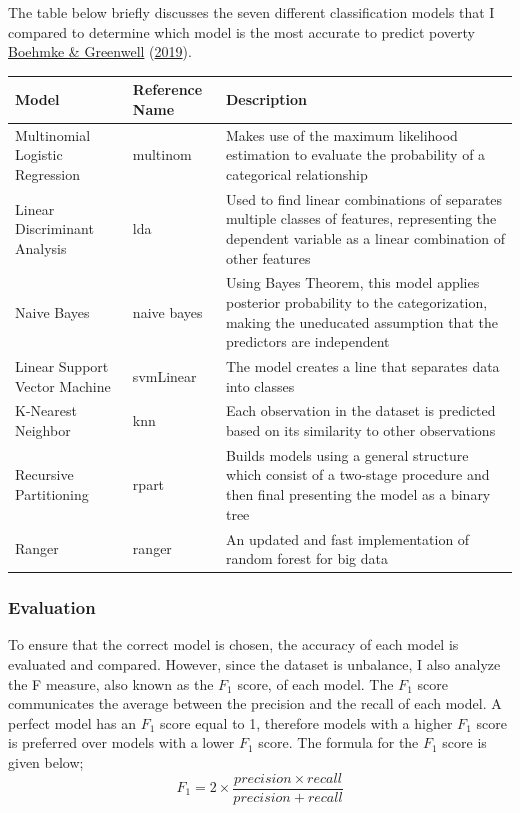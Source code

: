 \documentclass[11pt,preprint, authoryear]{elsarticle}
\numberwithin{equation}{section}
\numberwithin{figure}{section}
\numberwithin{table}{section}
\begin{document}
The table below briefly discusses the seven different classification
models that I compared to determine which model is the most accurate to
predict poverty \protect\hyperlink{ref-boehmke2019hands}{Boehmke \&
Greenwell} (\protect\hyperlink{ref-boehmke2019hands}{2019}).

\begin{center}
\begin{tabular}{| m{10em} | m{2cm}| m{10cm} |}
\hline
\textbf{Model} & \textbf{Reference Name} & \textbf{Description} \\
\hline
Multinomial Logistic Regression &  multinom & Makes use of the maximum likelihood estimation to evaluate the probability of a categorical relationship \\
\hline
Linear Discriminant Analysis & lda & Used to find linear combinations of separates multiple classes of features, representing the dependent variable as a linear combination of other features \\
\hline
Naive Bayes & naive bayes & Using Bayes Theorem, this model applies posterior probability to the categorization, making the uneducated assumption that the predictors are independent \\
\hline
Linear Support Vector Machine & svmLinear & The model creates a line that separates data into classes \\
\hline
K-Nearest Neighbor & knn & Each observation in the dataset is predicted based on its similarity to other observations \\
\hline
Recursive Partitioning & rpart & Builds models using a general structure which consist of a two-stage procedure and then final presenting the model as a binary tree \\
\hline 
Ranger & ranger & An updated and fast implementation of random forest for big data \\
\hline
\end{tabular}
\end{center}

\hypertarget{evaluation}{%
\subsubsection{Evaluation}\label{evaluation}}

To ensure that the correct model is chosen, the accuracy of each model
is evaluated and compared. However, since the dataset is unbalance, I
also analyze the F measure, also known as the \(F_1\) score, of each
model. The \(F_1\) score communicates the average between the precision
and the recall of each model. A perfect model has an \(F_1\) score equal
to 1, therefore models with a higher \(F_1\) score is preferred over
models with a lower \(F_1\) score. The formula for the \(F_1\) score is
given below;
\[F_1 = 2\times \frac{ precision \times recall}{precision + recall}\]
\end{document}
